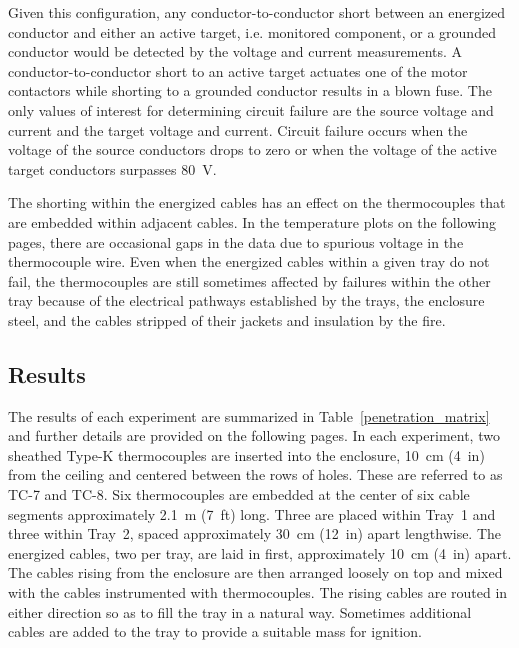 Given this configuration, any conductor-to-conductor short between an energized conductor and either an active target, i.e. monitored component, or a grounded conductor would be detected by the voltage and current measurements. A conductor-to-conductor short to an active target actuates one of the motor contactors while shorting to a grounded conductor results in a blown fuse.  The only values of interest for determining circuit failure are the source voltage and current and the target voltage and current. Circuit failure occurs when the voltage of the source conductors drops to zero or when the voltage of the active target conductors surpasses 80~V.

The shorting within the energized cables has an effect on the thermocouples that are embedded within adjacent cables. In the temperature plots on the following pages, there are occasional gaps in the data due to spurious voltage in the thermocouple wire. Even when the energized cables within a given tray do not fail, the thermocouples are still sometimes affected by failures within the other tray because of the electrical pathways established by the trays, the enclosure steel, and the cables stripped of their jackets and insulation by the fire.


\clearpage


\subsection{Results}

The results of each experiment are summarized in Table~\ref{penetration_matrix} and further details are provided on the following pages. In each experiment, two sheathed Type-K thermocouples are inserted into the enclosure, 10~cm (4~in) from the ceiling and centered between the rows of holes. These are referred to as TC-7 and TC-8. Six thermocouples are embedded at the center of six cable segments approximately 2.1~m (7~ft) long. Three are placed within Tray~1 and three within Tray~2, spaced approximately 30~cm (12~in) apart lengthwise. The energized cables, two per tray, are laid in first, approximately 10~cm (4~in) apart. The cables rising from the enclosure are then arranged loosely on top and mixed with the cables instrumented with thermocouples. The rising cables are routed in either direction so as to fill the tray in a natural way. Sometimes additional cables are added to the tray to provide a suitable mass for ignition.


